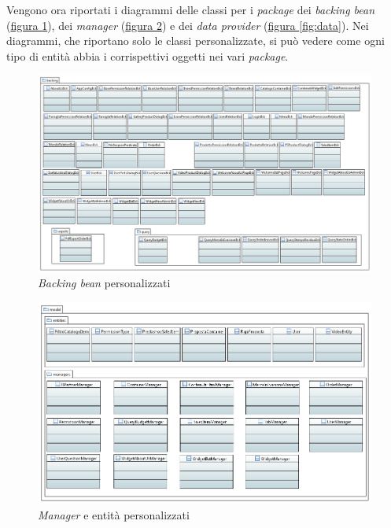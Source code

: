Vengono ora riportati i diagrammi delle classi per i \textit{package} dei \textit{backing bean} (\hyperref[fig:bck]{figura \ref{fig:bck}}), dei \textit{manager} (\hyperref[fig:manager]{figura \ref{fig:manager}}) e dei \textit{data provider} (\hyperref[fig:data]{figura \ref{fig:data}}). Nei diagrammi, che riportano solo le classi personalizzate, si può vedere come ogni tipo di entità abbia i corrispettivi oggetti nei vari \textit{package}.
\begin{figure}
	\centering
	\includegraphics[height=\linewidth,angle=90]{Immagini/p2/bck.png}
	\caption{\textit{Backing bean} personalizzati}
	\label{fig:bck}
\end{figure}
\begin{figure}
	\centering
	\includegraphics[width=\linewidth]{Immagini/p2/manager.png}
	\caption{\textit{Manager} e entità personalizzati}
	\label{fig:manager}
\end{figure}
